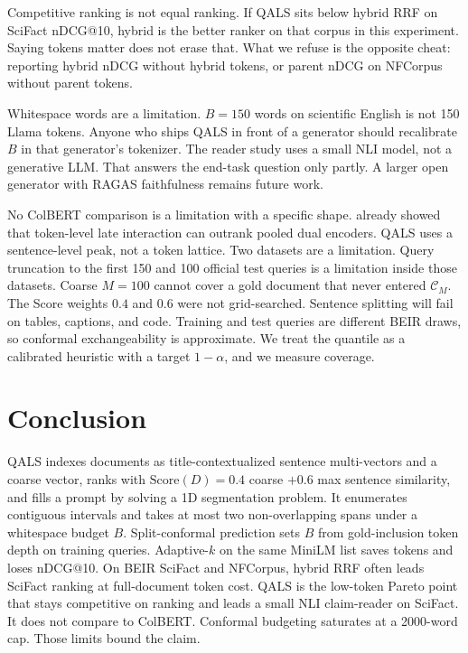 \documentclass[preprint,12pt,authoryear]{elsarticle}
\begin{document}
Competitive ranking is not equal ranking. If QALS sits below hybrid RRF on SciFact nDCG@10, hybrid is the better ranker on that corpus in this experiment. Saying tokens matter does not erase that. What we refuse is the opposite cheat: reporting hybrid nDCG without hybrid tokens, or parent nDCG on NFCorpus without parent tokens.

Whitespace words are a limitation. \(B=150\) words on scientific English is not 150 Llama tokens. Anyone who ships QALS in front of a generator should recalibrate \(B\) in that generator's tokenizer. The reader study uses a small NLI model, not a generative LLM. That answers the end-task question only partly. A larger open generator with RAGAS faithfulness remains future work.

No ColBERT comparison is a limitation with a specific shape. \citet{khattab2020colbert} already showed that token-level late interaction can outrank pooled dual encoders. QALS uses a sentence-level peak, not a token lattice. Two datasets are a limitation. Query truncation to the first 150 and 100 official test queries is a limitation inside those datasets. Coarse \(M=100\) cannot cover a gold document that never entered \(\mathcal{C}_M\). The Score weights \(0.4\) and \(0.6\) were not grid-searched. Sentence splitting will fail on tables, captions, and code. Training and test queries are different BEIR draws, so conformal exchangeability is approximate. We treat the quantile as a calibrated heuristic with a target \(1-\alpha\), and we measure coverage.

\section{Conclusion}
QALS indexes documents as title-contextualized sentence multi-vectors and a coarse vector, ranks with \(\mathrm{Score}(D)=0.4\) coarse \(+0.6\) max sentence similarity, and fills a prompt by solving a 1D segmentation problem. It enumerates contiguous intervals and takes at most two non-overlapping spans under a whitespace budget \(B\). Split-conformal prediction sets \(B\) from gold-inclusion token depth on training queries. Adaptive-\(k\) on the same MiniLM list saves tokens and loses nDCG@10. On BEIR SciFact and NFCorpus, hybrid RRF often leads SciFact ranking at full-document token cost. QALS is the low-token Pareto point that stays competitive on ranking and leads a small NLI claim-reader on SciFact. It does not compare to ColBERT. Conformal budgeting saturates at a 2000-word cap. Those limits bound the claim.
\end{document}
